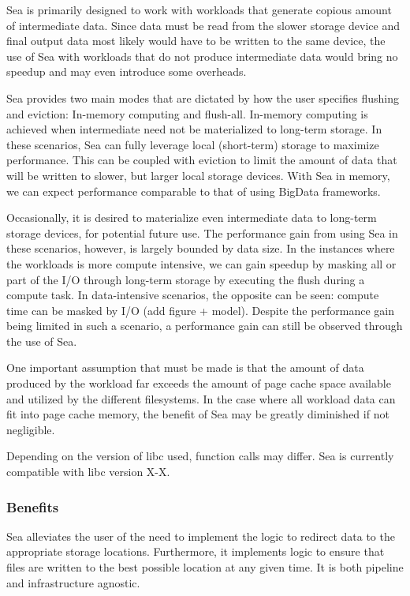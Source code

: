 \documentclass[10pt,journal,compsoc]{IEEEtran}
\begin{document}
Sea is primarily designed to work with workloads that generate copious amount of intermediate data.
Since data must be read from the slower storage device and final output data most likely would have to
be written to the same device, the use of Sea with workloads that do not produce intermediate data would
bring no speedup and may even introduce some overheads. 

Sea provides two main modes that are dictated by how the user specifies flushing and eviction: In-memory computing and flush-all.
In-memory computing is achieved when intermediate need not be materialized to long-term storage. In these scenarios, Sea can fully
leverage local (short-term) storage to maximize performance. This can be coupled with eviction to limit the amount of
data that will be written to slower, but larger local storage devices. With Sea in memory, we can expect performance comparable to
that of using BigData frameworks.

Occasionally, it is desired to materialize even intermediate data to long-term storage devices, for potential future use. The
performance gain from using Sea in these scenarios, however, is largely bounded by data size. In the instances where the workloads is more compute intensive,
we can gain speedup by masking all or part of the I/O through long-term storage by executing the flush during a compute task. In data-intensive scenarios, the 
opposite can be seen: compute time can be masked by I/O (add figure + model). Despite the performance gain being limited in
such a scenario, a performance gain can still be observed through the use of Sea.

One important assumption that must be made is that the amount of data produced by the workload far exceeds the amount of page cache space available and utilized
by the different filesystems. In the case where all workload data can fit into page cache memory, the benefit of Sea may be
greatly diminished if not negligible.

Depending on the version of libc used, function calls may differ. Sea is currently compatible with libc version X-X.


\subsubsection{Benefits}
Sea alleviates the user of the need to implement the logic to redirect data to the appropriate
storage locations. Furthermore, it implements logic to ensure that files are written to the best possible
location at any given time. It is both pipeline and infrastructure agnostic. 
\end{document}
